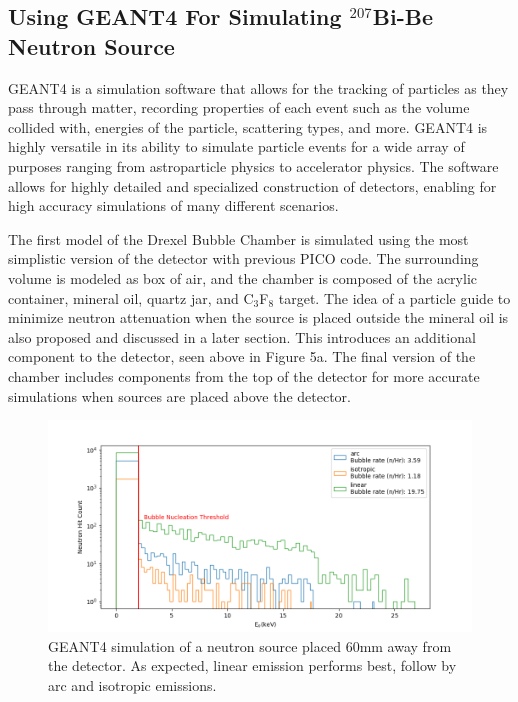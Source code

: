 \documentclass[%
12pt,
twoside,
reprint,
amsmath,amssymb,
aps,
]{article}
\begin{document}
	\subsection{Using GEANT4 For Simulating $^{207}$Bi-Be Neutron Source} 
	\par GEANT4 is a simulation software that allows for the tracking of particles as they pass through matter, recording properties of each event such as the volume collided with, energies of the particle, scattering types, and more. GEANT4 is highly versatile in its ability to simulate particle events for a wide array of purposes ranging from astroparticle physics to accelerator physics. The software allows for highly detailed and specialized construction of detectors, enabling for high accuracy simulations of many different scenarios.
	\par The first model of the Drexel Bubble Chamber is simulated using the most simplistic version of the detector with previous PICO code. The surrounding volume is modeled as box of air, and the chamber is composed of the acrylic container, mineral oil, quartz jar, and C$_{3}$F$_{8}$ target. The idea of a particle guide to minimize neutron attenuation when the source is placed outside the mineral oil is also proposed and discussed in a later section. This introduces an additional component to the detector, seen above in Figure 5a. The final version of the chamber includes components from the top of the detector for more accurate simulations when sources are placed above the detector.
	\begin{figure}[!b]
		\includegraphics[scale = 0.6, center]{Images/emission_log.png}
		\caption{\label{tab:table-name} GEANT4 simulation of a neutron source placed 60mm away from the detector. As expected, linear emission performs best, follow by arc and isotropic emissions.}
	\end{figure}
\end{document}
